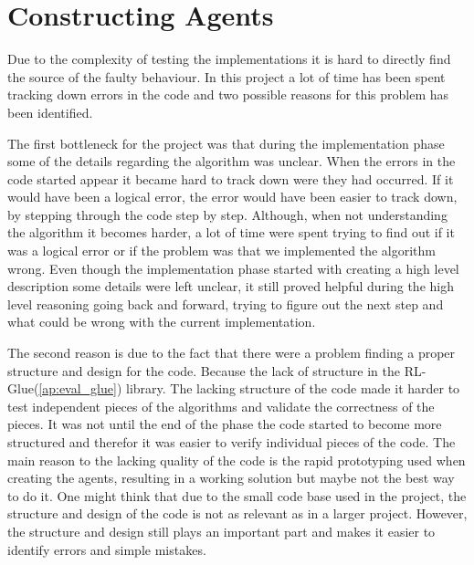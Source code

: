 \section{Constructing Agents}
\label{ap:constructing_experiments}
Due to the complexity of testing the implementations it is hard to directly find the source of the faulty behaviour. In this project a lot of time has been spent tracking down errors in the code and two possible reasons for this problem has been identified.

The first bottleneck for the project was that during the implementation phase some of the details regarding the algorithm was unclear. When the errors in the code started appear it became hard to track down were they had occurred. If it would have been a logical error, the error would have been easier to track down, by stepping through the code step by step. Although, when not understanding the algorithm it becomes harder, a lot of time were spent trying to find out if it was a logical error or if the problem was that we implemented the algorithm wrong. Even though the implementation phase started with creating a high level description some details were left unclear, it still proved helpful during the high level reasoning going back and forward, trying to figure out the next step and what could be wrong with the current implementation.

The second reason is due to the fact that there were a problem finding a proper structure and design for the code. Because the lack of structure in the RL-Glue(\ref{ap:eval_glue}) library. The lacking structure of the code made it harder to test independent pieces of the algorithms and validate the correctness of the pieces. It was not until the end of the phase the code started to become more structured and therefor it was easier to verify individual pieces of the code. The main reason to the lacking quality of the code is the rapid prototyping used when creating the agents, resulting in a working solution but maybe not the best way to do it. One might think that due to the small code base used in the project, the structure and design of the code is not as relevant as in a larger project. However, the structure and design still plays an important part and makes it easier to identify errors and simple mistakes.